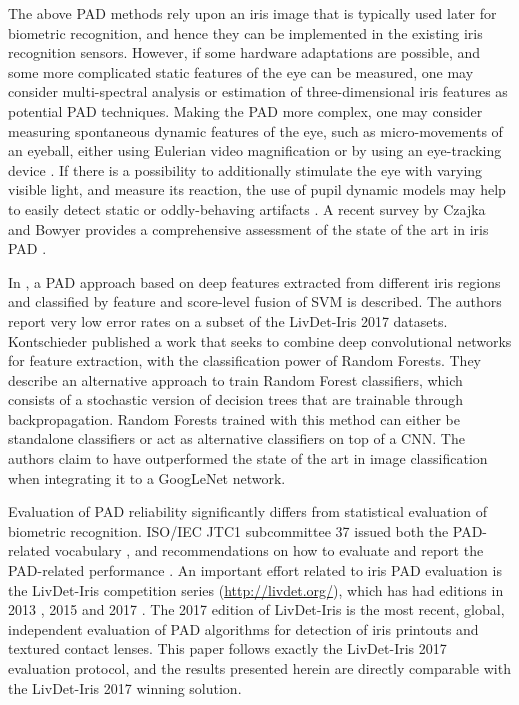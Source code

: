 The above PAD methods rely upon an iris image that is typically used later for biometric recognition, and hence they can be implemented in the existing iris recognition sensors. However, if some hardware adaptations are possible, and some more complicated static features of the eye can be measured, one may consider multi-spectral analysis \cite{Lee_BS_2006,Park_OptEng_2007,Chen_PRL_2012,Thavalengal_TCE_2016} or estimation of three-dimensional iris features \cite{Pacut_ICCST_2006,Lee_IMA_2010,Connell_ASSP_2013,Hughes_HICSS_2013} as potential PAD techniques. Making the PAD more complex, one may consider measuring spontaneous dynamic features of the eye, such as micro-movements of an eyeball, either using Eulerian video magnification \cite{Raja_TIFS_2015} or by using an eye-tracking device \cite{Rigas_PRL_2015}. If there is a possibility to additionally stimulate the eye with varying visible light, and measure its reaction, the use of pupil dynamic models may help to easily detect static or oddly-behaving artifacts \cite{Czajka_TIFS_2015,Thavalengal_TCE_2016}. A recent survey  by Czajka and Bowyer provides a comprehensive assessment of the state of the art in iris PAD \cite{Czajka_CSUR_2018}.

In \cite{Nguyen_2018}, a PAD approach based on deep features extracted from different iris regions and classified by feature and score-level fusion of SVM is described. The authors report very low error rates on a subset of the LivDet-Iris 2017 datasets.
Kontschieder \etal \cite{kontschieder2015deep} published a work that seeks to combine deep convolutional networks for feature extraction, with the classification power of Random Forests. They describe an alternative approach to train Random Forest classifiers, which consists of a stochastic version of decision trees that are trainable through backpropagation. Random Forests trained with this method can either be standalone classifiers or act as alternative classifiers on top of a CNN. The authors claim to have outperformed the state of the art in image classification when integrating it to a GoogLeNet network.

Evaluation of PAD reliability significantly differs from statistical evaluation of biometric recognition. ISO/IEC JTC1 subcommittee 37 issued both the PAD-related vocabulary \cite{ISO_30107-1_2016}, and recommendations on how to evaluate and report the PAD-related performance \cite{ISO_30107-3_2017}. An important effort related to iris PAD evaluation is the LivDet-Iris competition series (\url{http://livdet.org/}), which has had editions in 2013 \cite{Yambay2014}, 2015 \cite{Yambay2015} and 2017 \cite{Yambay2017}. The  2017 edition of LivDet-Iris is the most recent, global, independent evaluation of PAD algorithms for detection of iris printouts and textured contact lenses. This paper follows exactly the LivDet-Iris 2017 evaluation protocol, and the results presented herein are directly comparable with the LivDet-Iris 2017 winning solution.